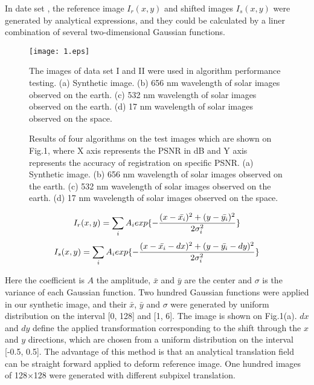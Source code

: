 \documentclass[conference]{IEEEtran}
\begin{document}
In date set \uppercase\expandafter{}, the reference image $I_{r}(x,y)$ and shifted images $I_{s}(x,y)$ were generated by analytical expressions, and they could be calculated by a liner combination of several two-dimensional Gaussian functions.
\begin{figure}[htp]
\centerline{\texttt{[image: 1.eps]}}
\caption{The images of data set I and II were used in algorithm performance testing.  (a) Synthetic image. (b) 656 nm wavelength of solar images observed on the earth. (c) 532 nm wavelength of solar images observed on the earth. (d) 17 nm wavelength of solar images observed on the space.}
\label{fig_1}
\end{figure}
{\begin{figure*}[thb]
        \begin{center}
        \caption{Results of four algorithms on the test images which are shown on Fig.1, where X axis represents the PSNR in dB and Y axis represents the accuracy of registration on specific PSNR. (a) Synthetic image.  (b) 656 nm wavelength of solar images observed on the earth. (c) 532 nm wavelength of solar images observed on the earth. (d) 17 nm wavelength of solar images observed on the space.}
        \label{fig:qq}
        \end{center}
\end{figure*}}

\begin{equation}
    I_{r}(x,y)=\sum_{i}A_{i}exp\{-\frac{(x-\bar{x_{i}})^{2}+(y-\bar{y_{i}})^{2}}{2\sigma_{i}^{2}}\}   \\
\end{equation}
\begin{equation}
    I_{s}(x,y)=\sum_{i}A_{i}exp\{-\frac{(x-\bar{x_{i}}-dx)^{2}+(y-\bar{y_{i}}-dy)^{2}}{2\sigma_{i}^{2}}\} \\
\end{equation}

Here the coefficient is $A$ the amplitude, $\bar{x}$ and $\bar{y}$ are the center and $\sigma$ is the variance of each Gaussian function. Two hundred Gaussian functions were applied in our synthetic image, and their $\bar{x}$, $\bar{y}$ and $\sigma$ were generated by uniform distribution on the interval [0, 128] and [1, 6]. The image is shown on Fig.1(a). $dx$ and $dy$ define the applied transformation corresponding to the shift through the $x$ and $y$ directions, which are chosen from a uniform distribution on the interval [-0.5, 0.5]. The advantage of this method is that an analytical translation field can be straight forward applied to deform reference image\cite{cit:17}.  One hundred images of 128$\times$128 were generated with different subpixel translation.
\end{document}
